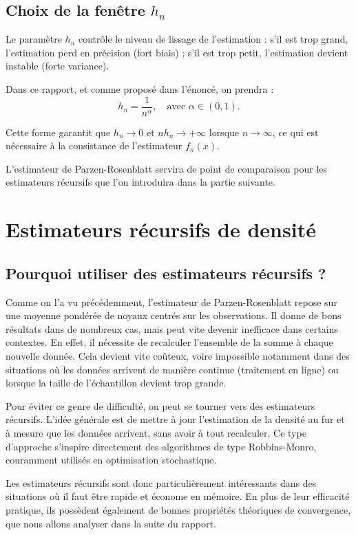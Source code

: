 \documentclass[12pt]{article}
\begin{document}
\subsection*{Choix de la fenêtre \( h_n \)}

Le paramètre \( h_n \) contrôle le niveau de lissage de l’estimation : s’il est trop grand, l'estimation perd en précision (fort biais) ; s’il est trop petit, l’estimation devient instable (forte variance).


Dans ce rapport, et comme proposé dans l’énoncé, on prendra :
\[
h_n = \frac{1}{n^{\alpha}}, \quad \text{avec } \alpha \in (0,1).
\]

Cette forme garantit que \( h_n \to 0 \) et \( n h_n \to +\infty \) lorsque \( n \to \infty \), ce qui est nécessaire à la consistance de l’estimateur \( f_n(x) \).

\vspace{1em}
L’estimateur de Parzen-Rosenblatt servira de point de comparaison pour les estimateurs récursifs que l’on introduira dans la partie suivante.

\section{Estimateurs récursifs de densité}

\subsection{Pourquoi utiliser des estimateurs récursifs ? }

Comme on l’a vu précédemment, l’estimateur de Parzen-Rosenblatt repose sur une moyenne pondérée de noyaux centrés sur les observations. Il donne de bons résultats dans de nombreux cas, mais peut vite devenir inefficace dans certains contextes. En effet, il nécessite de recalculer l’ensemble de la somme à chaque nouvelle donnée. Cela devient vite coûteux, voire impossible notamment dans des situations où les données arrivent de manière continue (traitement en ligne) ou lorsque la taille de l’échantillon devient trop grande.

Pour éviter ce genre de difficulté, on peut se tourner vers des estimateurs récursifs. L’idée générale est de mettre à jour l’estimation de la densité au fur et à mesure que les données arrivent, sans avoir à tout recalculer. Ce type d’approche  s’inspire directement des algorithmes de type Robbins-Monro, couramment utilisés en optimisation stochastique.

Les estimateurs récursifs sont donc particulièrement intéressants dans des situations où il faut être rapide et économe en mémoire. En plus de leur efficacité pratique, ils possèdent également de bonnes propriétés théoriques de convergence, que nous allons analyser dans la suite du rapport.
\end{document}
